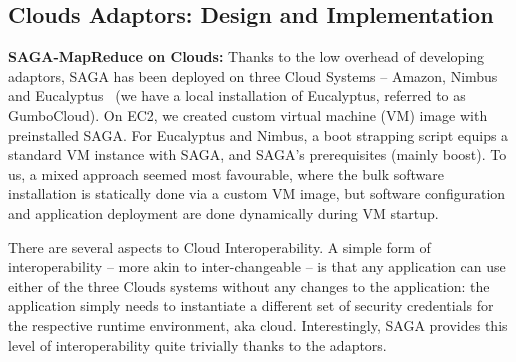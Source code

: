 \documentclass[conference,final]{IEEEtran}
\begin{document}

\subsection{Clouds Adaptors: Design and Implementation}


{\bf SAGA-MapReduce on Clouds: } Thanks to the low overhead of
developing adaptors, SAGA has been deployed on three Cloud Systems --
Amazon, Nimbus~\cite{nimbus} and Eucalyptus~\cite{eucalyptus} (we have
a local installation of Eucalyptus, referred to as GumboCloud).  On
EC2, we created custom virtual machine (VM) image with preinstalled
SAGA.  For Eucalyptus and Nimbus, a boot strapping script equips a
standard VM instance with SAGA, and SAGA's prerequisites (mainly
boost).  To us, a mixed approach seemed most favourable, where the
bulk software installation is statically done via a custom VM image,
but software configuration and application deployment are done
dynamically during VM startup.

There are several aspects to Cloud Interoperability. A simple form of
interoperability -- more akin to inter-changeable -- is that any
application can use either of the three Clouds systems without any
changes to the application: the application simply needs to
instantiate a different set of security credentials for the respective
runtime environment, aka cloud.  Interestingly, SAGA provides this level of
interoperability quite trivially thanks to the adaptors.
\end{document}
